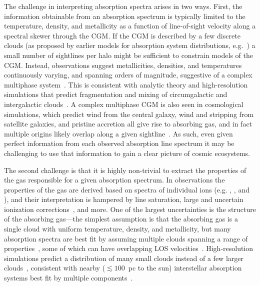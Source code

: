 \documentclass[fleqn,usenatbib]{mnras}
\begin{document}
The challenge in interpreting absorption spectra arises in two ways.
First, the information obtainable from an absorption spectrum is typically limited to the temperature, density, and metallicity as a function of line-of-sight velocity along a spectral skewer through the CGM.
If the CGM is described by a few discrete clouds (as proposed by earlier models for absorption system distributions, e.g.~\citealt{srianand1994Halo, das2001Unified, maller2003Damped}) a small number of sightlines per halo might be sufficient to constrain models of the CGM.
Instead, observations suggest metallicities, densities, and temperatures continuously varying, and spanning orders of magnitude, suggestive of a complex multiphase system~\citep{Lehner2019, Lehner2022}.
This is consistent with analytic theory and high-resolution simulations that predict fragmentation and mixing of circumgalactic and intergalactic clouds~\citep[e.g.][]{maller2004Multiphase, mccourt2018Characteristic, hummels2019Impact, vandevoort2019Cosmological, peeples2019Figuring, mandelker2019Shattering, mandelker2021Thermal}.
A complex multiphase CGM is also seen in cosmological simulations, which predict wind from the central galaxy, wind and stripping from satellite galaxies, and pristine accretion all give rise to absorbing gas, and in fact multiple origins likely overlap along a given sightline~\citep[e.g.][]{hafen2019Origins, hafen2020Fates}.
As such, even given perfect information from each observed absorption line spectrum it may be challenging to use that information to gain a clear picture of cosmic ecosystems.

The second challenge is that it is highly non-trivial to extract the properties of the gas responsible for a given absorption spectrum.
In observations the properties of the gas are derived based on spectra of individual ions (e.g. , , and ), and their interpretation is hampered by line saturation, large and uncertain ionization corrections~\citep[e.g.][]{schaye2006Importance, acharya2021How}, and more.
One of the largest uncertainties is the structure of the absorbing gas---the simplest assumption is that the absorbing gas is a single cloud with uniform temperature, density, and metallicity, but many absorption spectra are best fit by assuming multiple clouds spanning a range of properties~\citep[e.g.][]{boksenberg1979Multiple, muzahid2015Extreme, liang2017BayesVP, liang2018Model,Lehner2019,Wotta2019, haislmaier2021COS, sameer2021Cloudbycloud, zahedy2021.CUBS.III.zle1.LLSs, marra2021.cosmo.sims.test.observational.modeling, narayanan2021.a.multiphase.pLLS, nielsen2022.a.multiphase.DLA}, some of which can have overlapping LOS velocities~\citep[e.g.][]{marra2022Examining}.
High-resolution simulations predict a distribution of many small clouds instead of a few larger clouds~\citep[e.g.][]{fielding2020Multiphase, vijayan2021Xray},
consistent with nearby ($\lesssim 100$~pc to the sun) interstellar absorption systems best fit by multiple components~\citep[e.g.][]{welsh2010HighResolution}.
\end{document}
